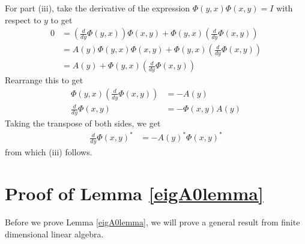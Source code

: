 \documentclass[thesis.tex]{subfiles}
\begin{document}
For part (iii), take the derivative of the expression $\Phi(y, x)\Phi(x, y) = I$ with respect to $y$ to get
\begin{align*}
0 &= \left(\frac{d}{dy}\Phi(y, x)\right) \Phi(x, y) +
\Phi(y, x)\left(\frac{d}{dy}\Phi(x, y)\right) \\
&= A(y)\Phi(y, x) \Phi(x, y) +
\Phi(y, x)\left(\frac{d}{dy}\Phi(x, y)\right) \\
&= A(y) + \Phi(y, x)\left(\frac{d}{dy}\Phi(x, y)\right) 
\end{align*}
Rearrange this to get
\begin{align*}
\Phi(y, x)\left(\frac{d}{dy}\Phi(x, y)\right) &= -A(y) \\
\frac{d}{dy}\Phi(x, y) &= -\Phi(x, y) A(y) 
\end{align*}
Taking the transpose of both sides, we get
\begin{align*}
\frac{d}{dy}\Phi(x, y)^* &= -A(y)^* \Phi(x, y)^*  
\end{align*}
from which (iii) follows.

\section{Proof of Lemma \ref{eigA0lemma}}

Before we prove Lemma \ref{eigA0lemma}, we will prove a general result from finite dimensional linear algebra.
\end{document}
